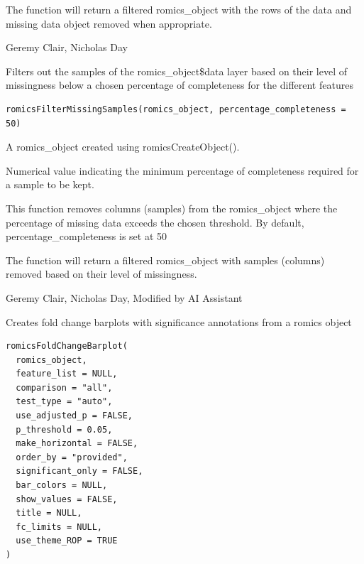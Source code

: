 \documentclass[a4paper]{book}
\begin{document}
%
\begin{Value}
The function will return a filtered romics\_object with the rows of the data and missing data object removed when appropriate.
\end{Value}
%
\begin{Author}
Geremy Clair, Nicholas Day
\end{Author}
%
\begin{Description}
Filters out the samples of the romics\_object\$data layer based on their level of missingness below a chosen percentage of completeness for the different features
\end{Description}
%
\begin{Usage}
\begin{verbatim}
romicsFilterMissingSamples(romics_object, percentage_completeness = 50)
\end{verbatim}
\end{Usage}
%
\begin{Arguments}
\begin{ldescription}
\item[\code{romics\_object}] A romics\_object created using romicsCreateObject().

\item[\code{percentage\_completeness}] Numerical value indicating the minimum percentage of completeness required for a sample to be kept.
\end{ldescription}
\end{Arguments}
%
\begin{Details}
This function removes columns (samples) from the romics\_object where the percentage of missing data exceeds the chosen threshold. By default, percentage\_completeness is set at 50
\end{Details}
%
\begin{Value}
The function will return a filtered romics\_object with samples (columns) removed based on their level of missingness.
\end{Value}
%
\begin{Author}
Geremy Clair, Nicholas Day, Modified by AI Assistant
\end{Author}
%
\begin{Description}
Creates fold change barplots with significance annotations from a romics object
\end{Description}
%
\begin{Usage}
\begin{verbatim}
romicsFoldChangeBarplot(
  romics_object,
  feature_list = NULL,
  comparison = "all",
  test_type = "auto",
  use_adjusted_p = FALSE,
  p_threshold = 0.05,
  make_horizontal = FALSE,
  order_by = "provided",
  significant_only = FALSE,
  bar_colors = NULL,
  show_values = FALSE,
  title = NULL,
  fc_limits = NULL,
  use_theme_ROP = TRUE
)
\end{verbatim}
\end{Usage}
\end{document}
